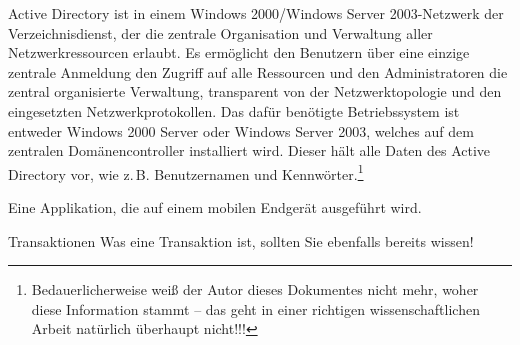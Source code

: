 {Active Directory ist in einem Windows 2000/Windows
Server 2003-Netzwerk der Verzeichnisdienst, der die zentrale
Organisation und Verwaltung aller Netzwerkressourcen erlaubt. Es
erm\"oglicht den Benutzern \"uber eine einzige zentrale Anmeldung den
Zugriff auf alle Ressourcen und den Administratoren die zentral
organisierte Verwaltung, transparent von der Netzwerktopologie und
den eingesetzten Netzwerkprotokollen. Das daf\"ur ben\"otigte
Betriebssystem ist entweder Windows 2000 Server oder
Windows Server 2003, welches auf dem zentralen
Dom\"anencontroller installiert wird. Dieser h\"alt alle Daten des
Active Directory vor, wie z.\,B. Benutzernamen und
Kennw\"orter.\protect\footnote{Bedauerlicherweise wei{\ss} der Autor dieses Dokumentes nicht mehr, woher diese Information stammt -- das 
geht in einer richtigen wissenschaftlichen Arbeit nat\"urlich \"uberhaupt nicht!!!}}





%

{Eine Applikation, die auf einem mobilen Endger\"at ausgef\"uhrt wird.}


%
{Transaktionen}%
{Was eine Transaktion ist, sollten Sie ebenfalls bereits wissen!}





%


%
%



